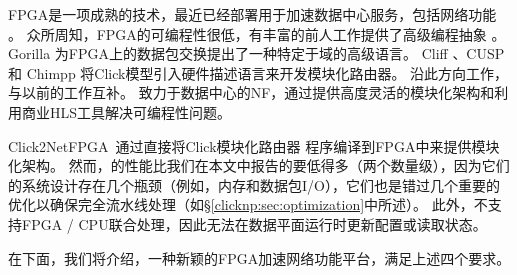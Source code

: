 FPGA是一项成熟的技术，最近已经部署用于加速数据中心服务，包括网络功能 \cite {putnam2014reconfigurable,smartnic,rubow2010chimpp,lavasani2012compiling}。
众所周知，FPGA的可编程性很低，有丰富的前人工作提供了高级编程抽象 \cite {bluespec,auerbach2010lime,bacon2013fpga,singh2011implementing,bachrach2012chisel,wester2015transformation}。
Gorilla \cite {lavasani2012compiling} 为FPGA上的数据包交换提出了一种特定于域的高级语言。
Cliff \cite{kulkarni2004mapping}、CUSP \cite{schelle2005cusp} 和 Chimpp \cite {rubow2010chimpp} 将Click模型引入硬件描述语言来开发模块化路由器。
\name 沿此方向工作，与以前的工作互补。
\name 致力于数据中心的NF，通过提供高度灵活的模块化架构和利用商业HLS工具解决可编程性问题。

Click2NetFPGA~\cite {Click2NetFPGA}通过直接将Click模块化路由器 \cite {kohler2000click}程序编译到FPGA中来提供模块化架构。
然而，\cite {Click2NetFPGA}的性能比我们在本文中报告的要低得多（两个数量级），因为它们的系统设计存在几个瓶颈（例如，内存和数据包I/O），它们也是错过几个重要的优化以确保完全流水线处理（如\S \ref {clicknp:sec:optimization}中所述）。
此外，\cite {Click2NetFPGA}不支持FPGA / CPU联合处理，因此无法在数据平面运行时更新配置或读取状态。



在下面，我们将介绍\name{}，一种新颖的FPGA加速网络功能平台，满足上述四个要求。

